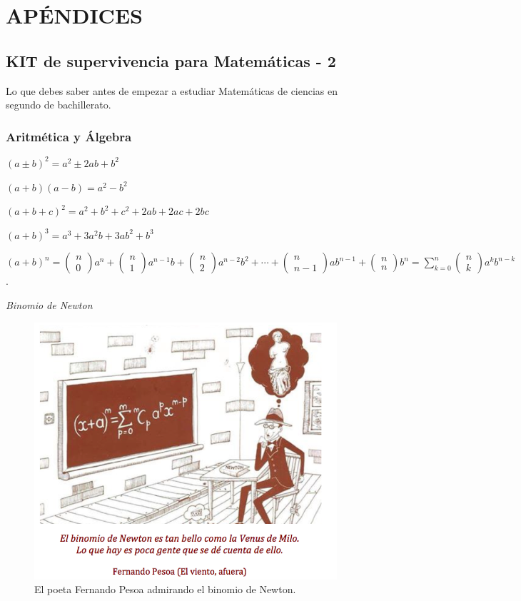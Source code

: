 \part{APÉNDICES}
\chapter{KIT de supervivencia para Matemáticas - 2} \label{Kit}


Lo que debes saber antes de empezar a estudiar Matemáticas de ciencias en segundo de bachillerato.

\section{Aritmética y Álgebra}

\begin{multicols}{2}

$(a \pm b )^2=a^2 \pm 2 a b + b^2$ 

$(a+b)(a-b)=a^2-b^2$

$(a+b+c)^2 = a^2+b^2+c^2+2ab+2ac+2bc$

$(a+b)^3 = a^3 + 3a^2b + 3ab^2 +b^3 $

$(a+b)^n= \left(\begin{matrix}n\\0\end{matrix}\right) a^n + \left(\begin{matrix}n\\1\end{matrix}\right)a^{n-1}b + \left(\begin{matrix}n\\2\end{matrix}\right) a^{n-2}b^2+ \cdots + \left(\begin{matrix}n\\n-1\end{matrix}\right)a b^{n-1}+ \left(\begin{matrix}n\\n\end{matrix}\right)b^n=\sum _{ k=0 }^{ n }{ \left( \begin{matrix} n \\ k \end{matrix} \right)   a^k b^{n-k} }  \quad  $. 

\emph{Binomio de Newton}

 	\begin{figure}[H]
		\centering
		\includegraphics[width=.4\textwidth]{imagenes/apendices/APENDICESIM01.png}
		\caption {El poeta Fernando Pesoa admirando el binomio de Newton.}
	\end{figure}
\end{multicols}

